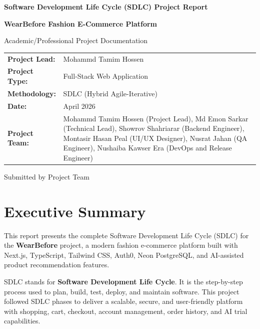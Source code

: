 \documentclass[12pt,a4paper]{article}
\begin{document}
\begin{titlepage}
    \centering
    \vspace*{2cm}
    {\LARGE\bfseries Software Development Life Cycle (SDLC) Project Report\par}
    \vspace{0.8cm}
    {\Large\bfseries WearBefore Fashion E-Commerce Platform\par}
    \vspace{1.2cm}
    {\large Academic/Professional Project Documentation\par}
    \vspace{2cm}

    \begin{tabular}{p{} p{}}
        \textbf{Project Lead:} & Mohammd Tamim Hossen \\
        \textbf{Project Type:} & Full-Stack Web Application \\
        \textbf{Methodology:} & SDLC (Hybrid Agile-Iterative) \\
        \textbf{Date:} & April 2026 \\
        \textbf{Project Team:} & Mohammd Tamim Hossen (Project Lead), Md Emon Sarkar (Technical Lead), Showrov Shahriarar (Backend Engineer), Montasir Hasan Peal (UI/UX Designer), Nusrat Jahan (QA Engineer), Nushaiba Kawser Era (DevOps and Release Engineer)
    \end{tabular}

    \vfill
    {\large Submitted by Project Team\par}

\end{titlepage}

\tableofcontents
\newpage

\section{Executive Summary}
This report presents the complete Software Development Life Cycle (SDLC) for the \textbf{WearBefore} project, a modern fashion e-commerce platform built with Next.js, TypeScript, Tailwind CSS, Auth0, Neon PostgreSQL, and AI-assisted product recommendation features.

SDLC stands for \textbf{Software Development Life Cycle}. It is the step-by-step process used to plan, build, test, deploy, and maintain software. This project followed SDLC phases to deliver a scalable, secure, and user-friendly platform with shopping, cart, checkout, account management, order history, and AI trial capabilities.
\end{document}
